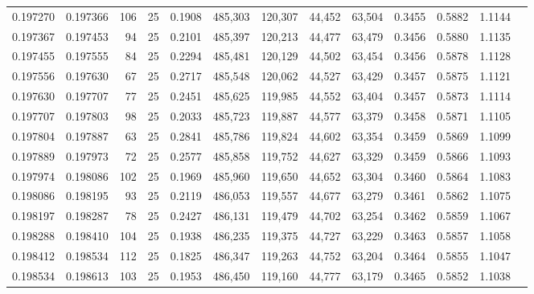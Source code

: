 \begin{tabular}{rrrrrrrrrrrrr}
0.197270 & 0.197366 &   106 &  25 &                                     0.1908 & 485,303 & 120,307 &  44,452 &  63,504 & 0.3455 & 0.5882 & 1.1144 \\
0.197367 & 0.197453 &    94 &  25 &                                     0.2101 & 485,397 & 120,213 &  44,477 &  63,479 & 0.3456 & 0.5880 & 1.1135 \\
0.197455 & 0.197555 &    84 &  25 &                                     0.2294 & 485,481 & 120,129 &  44,502 &  63,454 & 0.3456 & 0.5878 & 1.1128 \\
0.197556 & 0.197630 &    67 &  25 &                                     0.2717 & 485,548 & 120,062 &  44,527 &  63,429 & 0.3457 & 0.5875 & 1.1121 \\
0.197630 & 0.197707 &    77 &  25 &                                     0.2451 & 485,625 & 119,985 &  44,552 &  63,404 & 0.3457 & 0.5873 & 1.1114 \\
0.197707 & 0.197803 &    98 &  25 &                                     0.2033 & 485,723 & 119,887 &  44,577 &  63,379 & 0.3458 & 0.5871 & 1.1105 \\
0.197804 & 0.197887 &    63 &  25 &                                     0.2841 & 485,786 & 119,824 &  44,602 &  63,354 & 0.3459 & 0.5869 & 1.1099 \\
0.197889 & 0.197973 &    72 &  25 &                                     0.2577 & 485,858 & 119,752 &  44,627 &  63,329 & 0.3459 & 0.5866 & 1.1093 \\
0.197974 & 0.198086 &   102 &  25 &                                     0.1969 & 485,960 & 119,650 &  44,652 &  63,304 & 0.3460 & 0.5864 & 1.1083 \\
0.198086 & 0.198195 &    93 &  25 &                                     0.2119 & 486,053 & 119,557 &  44,677 &  63,279 & 0.3461 & 0.5862 & 1.1075 \\
0.198197 & 0.198287 &    78 &  25 &                                     0.2427 & 486,131 & 119,479 &  44,702 &  63,254 & 0.3462 & 0.5859 & 1.1067 \\
0.198288 & 0.198410 &   104 &  25 &                                     0.1938 & 486,235 & 119,375 &  44,727 &  63,229 & 0.3463 & 0.5857 & 1.1058 \\
0.198412 & 0.198534 &   112 &  25 &                                     0.1825 & 486,347 & 119,263 &  44,752 &  63,204 & 0.3464 & 0.5855 & 1.1047 \\
0.198534 & 0.198613 &   103 &  25 &                                     0.1953 & 486,450 & 119,160 &  44,777 &  63,179 & 0.3465 & 0.5852 & 1.1038 \\

\end{tabular}
